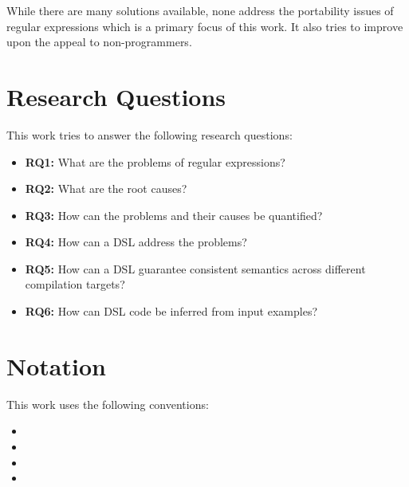 While there are many solutions available, none address the portability issues of regular expressions which is a primary focus of this work. It also tries to improve upon the appeal to non-programmers.

\section{Research Questions}

This work tries to answer the following research questions:

\newcommand*{\RQone}{What are the problems of regular expressions?}
\newcommand*{\RQtwo}{What are the root causes?}
\newcommand*{\RQthree}{How can the problems and their causes be quantified?}
\newcommand*{\RQfour}{How can a DSL address the problems?}
\newcommand*{\RQfive}{How can a DSL guarantee consistent semantics across different compilation targets?}
\newcommand*{\RQsix}{How can DSL code be inferred from input examples?}

\begin{itemize}
    \item \textbf{RQ1:} \RQone
    \item \textbf{RQ2:} \RQtwo
    \item \textbf{RQ3:} \RQthree
    \item \textbf{RQ4:} \RQfour
    \item \textbf{RQ5:} \RQfive
    \item \textbf{RQ6:} \RQsix
\end{itemize}

\section{Notation}

This work uses the following conventions:

\begin{itemize}
    \item {}
    \item {}
    \item {}
    \item {}
\end{itemize}
